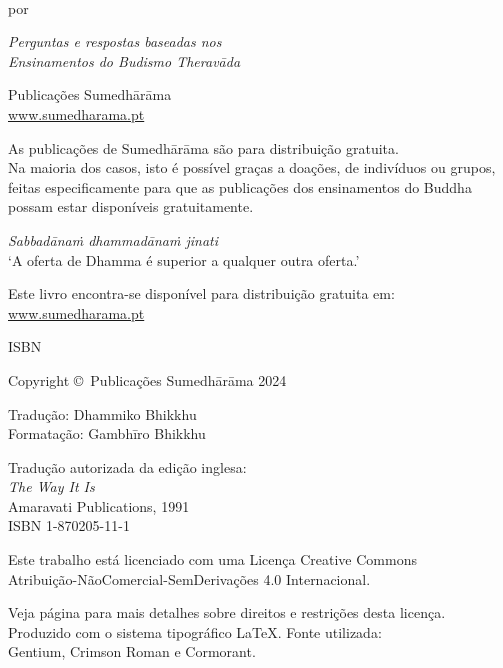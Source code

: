 \cleartoverso
\thispagestyle{empty}

{\copyrightsize
\centering
\setlength{\parindent}{0pt}%
\setlength{\parskip}{0.8\baselineskip}%

\thetitle\\
por \theauthor

\emph{Perguntas e respostas baseadas nos\\
Ensinamentos do Budismo Theravāda}

Publicações Sumedhārāma\\
\href{https://sumedharama.pt}{www.sumedharama.pt}

As publicações de Sumedhārāma são para distribuição gratuita.\\
Na maioria dos casos, isto é possível graças a doações, de indivíduos ou grupos,
feitas especificamente para que as publicações dos ensinamentos do Buddha possam
estar disponíveis gratuitamente.

\textit{Sabbadānaṁ dhammadānaṁ jinati}\\
‘A oferta de Dhamma é superior a qualquer outra oferta.’

Este livro encontra-se disponível para distribuição gratuita em:\\
\href{https://sumedharama.pt}{www.sumedharama.pt}

ISBN \theISBN

Copyright \copyright\ Publicações Sumedhārāma 2024

Tradução: Dhammiko Bhikkhu\\
Formatação: Gambhīro Bhikkhu

Tradução autorizada da edição inglesa:\\
\emph{The Way It Is}\\
Amaravati Publications, 1991\\
ISBN 1-870205-11-1

\vfill

{\footnotesize

Este trabalho está licenciado com uma Licença Creative Commons\\
Atribuição-NãoComercial-SemDerivações 4.0 Internacional.

Veja página \pageref{copyright-details} para mais detalhes sobre direitos e restrições desta licença.\\
Produzido com o sistema tipográfico \LaTeX. Fonte utilizada:\\
Gentium, Crimson Roman e Cormorant.

\theEditionInfo

}}
